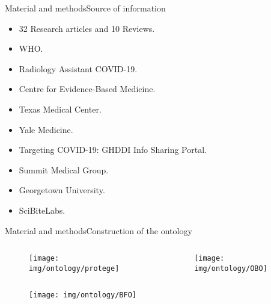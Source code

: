 \documentclass[10pt]{beamer}
\newcommand{\1}{
        	\setbeamertemplate{background}{
        		\texttt{[image: img/1]}
        		\tikz[overlay] \fill[fill opacity=0.75,fill=white] (0,0) rectangle (-\paperwidth,\paperheight);
        	}
}
\begin{document}
\begin{frame}{Material and methods}{Source of information}	
	\begin{itemize}
		\item 32 Research articles and 10 Reviews.
		 \item WHO.
		 \item Radiology Assistant COVID-19.
		 \item Centre for Evidence-Based Medicine.
		 \item Texas Medical Center.
		 \item Yale Medicine.
		 \item Targeting COVID-19: GHDDI Info Sharing Portal.
		 \item Summit Medical	Group.
		 \item Georgetown University.
		 \item SciBiteLabs.
	\end{itemize}
\end{frame}


\begin{frame}{Material and methods}{Construction of the ontology}	
	\begin{columns}
		\begin{column}{0.48\textwidth}
				\begin{figure}
					\centering
					\texttt{[image: img/ontology/protege]}
				\end{figure}			
		\end{column}
		\begin{column}{0.48\textwidth}
			\begin{figure}
				\centering
				\texttt{[image: img/ontology/OBO]}
			\end{figure}			
		\end{column}
	\end{columns}

	\vspace{1cm}

	\begin{figure}
		\centering
		\texttt{[image: img/ontology/BFO]}
	\end{figure}
\end{frame}
\end{document}

